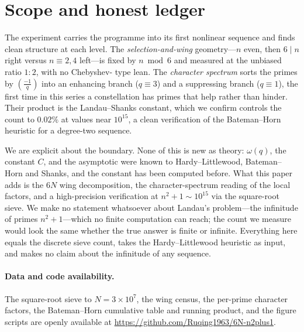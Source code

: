 \documentclass[11pt]{article}
\theoremstyle{definition}
\begin{document}
\FloatBarrier
\section{Scope and honest ledger}
The experiment carries the programme into its first nonlinear sequence and finds clean structure at
each level. The \emph{selection-and-wing} geometry---$n$ even, then $6\mid n$ right versus
$n\equiv2,4$ left---is fixed by $n\bmod6$ and measured at the unbiased ratio $1{:}2$, with no Chebyshev-
type lean. The \emph{character spectrum} sorts the primes by $\left(\frac{-1}{q}\right)$ into an
enhancing branch ($q\equiv3$) and a suppressing branch ($q\equiv1$), the first time in this series a
constellation has primes that help rather than hinder. Their product is the Landau--Shanks constant,
which we confirm controls the count to $0.02\%$ at values near $10^{15}$, a clean verification of the
Bateman--Horn heuristic for a degree-two sequence.

We are explicit about the boundary. None of this is new as theory: $\omega(q)$, the constant $C$, and
the asymptotic were known to Hardy--Littlewood, Bateman--Horn and Shanks, and the constant has been
computed before. What this paper adds is the $6N$ wing decomposition, the character-spectrum reading
of the local factors, and a high-precision verification at $n^2+1\sim10^{15}$ via the square-root
sieve. We make no statement whatsoever about Landau's problem---the infinitude of primes $n^2+1$---which
no finite computation can reach; the count we measure would look the same whether the true answer is
finite or infinite. Everything here equals the discrete sieve count, takes the Hardy--Littlewood
heuristic as input, and makes no claim about the infinitude of any sequence.

\paragraph{Data and code availability.} The square-root sieve to $N=3\times10^{7}$, the wing census,
the per-prime character factors, the Bateman--Horn cumulative table and running product, and the
figure scripts are openly available at \url{https://github.com/Ruqing1963/6N-n2plus1}.
\end{document}
